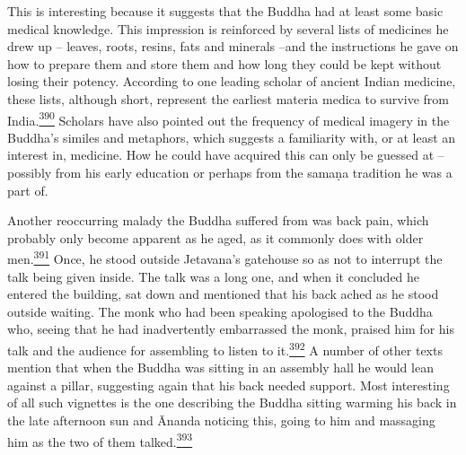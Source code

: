 This is interesting because it suggests that the Buddha had at least
some basic medical knowledge. This impression is reinforced by several
lists of medicines he drew up -- leaves, roots, resins, fats and
minerals --and the instructions he gave on how to prepare them and store
them and how long they could be kept without losing their potency.
According to one leading scholar of ancient Indian medicine, these
lists, although short, represent the earliest materia medica to survive
from
India.\label{footprints_split_011.html_fnref390}\hyperref[footprints_split_024.htmlux5cux23fn390]{\textsuperscript{390}}
Scholars have also pointed out the frequency of medical imagery in the
Buddha's similes and metaphors, which suggests a familiarity with, or at
least an interest in, medicine. How he could have acquired this can only
be guessed at -- possibly from his early education or perhaps from the
samaṇa tradition he was a part of.

Another reoccurring malady the Buddha suffered from was back pain, which
probably only become apparent as he aged, as it commonly does with older
men.\label{footprints_split_011.html_fnref391}\hyperref[footprints_split_024.htmlux5cux23fn391]{\textsuperscript{391}}
Once, he stood outside Jetavana's gatehouse so as not to interrupt the
talk being given inside. The talk was a long one, and when it concluded
he entered the building, sat down and mentioned that his back ached as
he stood outside waiting. The monk who had been speaking apologised to
the Buddha who, seeing that he had inadvertently embarrassed the monk,
praised him for his talk and the audience for assembling to listen to
it.\label{footprints_split_011.html_fnref392}\hyperref[footprints_split_024.htmlux5cux23fn392]{\textsuperscript{392}}
A number of other texts mention that when the Buddha was sitting in an
assembly hall he would lean against a pillar, suggesting again that his
back needed support. Most interesting of all such vignettes is the one
describing the Buddha sitting warming his back in the late afternoon sun
and Ānanda noticing this, going to him and massaging him as the two of
them
talked.\label{footprints_split_011.html_fnref393}\hyperref[footprints_split_024.htmlux5cux23fn393]{\textsuperscript{393}}

